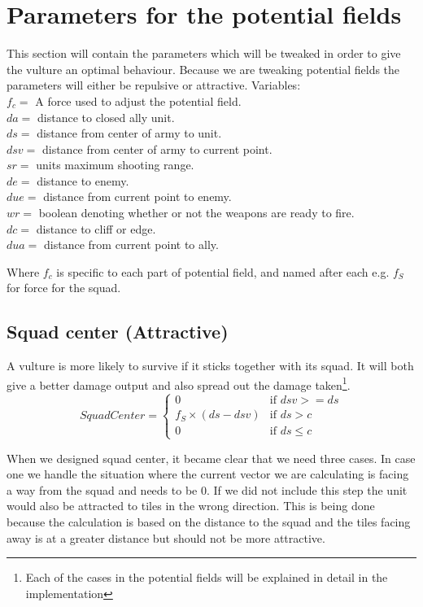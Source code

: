 \section{Parameters for the potential fields}
	This section will contain the parameters which will be tweaked in order to give the vulture an optimal behaviour. Because we are tweaking 
	potential fields the parameters will either be repulsive or attractive.
	\label{cha3_variables}
	Variables:\\
	$f_c =$ A force used to adjust the potential field.\\
	$da =$ distance to closed ally unit.\\
	$ds =$ distance from center of army to unit.\\
	$dsv =$ distance from center of army to current point.\\
	$sr =$ units maximum shooting range.\\
	$de =$ distance to enemy.\\
	$due =$ distance from current point to enemy.\\
	$wr =$ boolean denoting whether or not the weapons are ready to fire.\\
	$dc =$ distance to cliff or edge. \\
	$dua =$ distance from current point to ally.
	
	Where $f_c$ is specific to each part of potential field, and named after each e.g. $f_{S}$ for force for the squad.
	
	\subsection*{Squad center (Attractive)}
		\label{SCA_label}A vulture is more likely to survive if it sticks together with its squad. It will both give a better damage output and also spread out the 
		damage taken\footnote{Each of the cases in the potential fields will be explained in detail in the implementation}.
		\begin{displaymath}
			SquadCenter  = \begin{cases}
					0 & \text{if } dsv >= ds\\
					f_{S} \times (ds - dsv) & \text{if } ds > c\\
					0 & \text{if } ds \leq c
				\end{cases}		
		\end{displaymath}
		
		When we designed squad center, it became clear that we need three cases. 
		In case one we handle the situation where the current vector we are calculating is facing a way from the squad and needs to be 0. If we did not include this step the unit would also be attracted to tiles in the wrong direction. This is being done because the calculation is based on the distance to the squad and the tiles facing away is at a greater distance but should not be more attractive.
		
